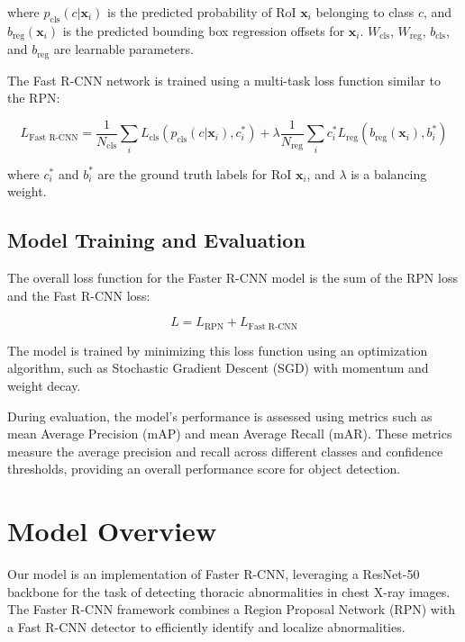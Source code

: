 \documentclass[12pt,oneside]{book} %
\begin{document}
where $p_{\text{cls}}(c | \mathbf{x}_i)$ is the predicted probability of RoI
$\mathbf{x}_i$ belonging to class $c$, and $b_{\text{reg}}(\mathbf{x}_i)$ is
the predicted bounding box regression offsets for $\mathbf{x}_i$.
$W_{\text{cls}}$, $W_{\text{reg}}$, $b_{\text{cls}}$, and $b_{\text{reg}}$ are
learnable parameters.

The Fast R-CNN network is trained using a multi-task loss function similar to
the RPN:

\begin{equation}
    L_{\text{Fast R-CNN}} = \frac{1}{N_{\text{cls}}} \sum_{i} L_{\text{cls}}(p_{\text{cls}}(c | \mathbf{x}_i), c_i^*) + \lambda \frac{1}{N_{\text{reg}}} \sum_{i} c_i^* L_{\text{reg}}(b_{\text{reg}}(\mathbf{x}_i), b_i^*)
\end{equation}

where $c_i^*$ and $b_i^*$ are the ground truth labels for RoI $\mathbf{x}_i$,
and $\lambda$ is a balancing weight.

\subsection{Model Training and Evaluation}

The overall loss function for the Faster R-CNN model is the sum of the RPN loss
and the Fast R-CNN loss:

\begin{equation}
    L = L_{\text{RPN}} + L_{\text{Fast R-CNN}}
\end{equation}

The model is trained by minimizing this loss function using an optimization
algorithm, such as Stochastic Gradient Descent (SGD) with momentum and weight
decay.

During evaluation, the model's performance is assessed using metrics such as
mean Average Precision (mAP) and mean Average Recall (mAR). These metrics
measure the average precision and recall across different classes and
confidence thresholds, providing an overall performance score for object
detection.

\section{Model Overview}
Our model is an implementation of Faster R-CNN, leveraging a ResNet-50 backbone
for the task of detecting thoracic abnormalities in chest X-ray images. The
Faster R-CNN framework combines a Region Proposal Network (RPN) with a Fast
R-CNN detector to efficiently identify and localize abnormalities.
\end{document}
